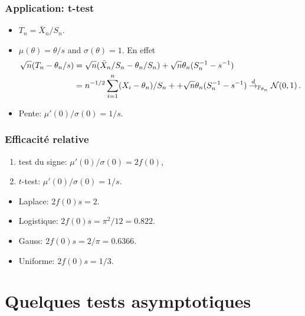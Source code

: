 \begin{frame}
\frametitle{Application: t-test}
\begin{itemize}
\item $T_n = \bar{X}_n/S_n$.
\item $\mu(\theta)= \theta/s$ and $\sigma(\theta)= 1$. En effet
\begin{align*}
\sqrt{n} ( T_n - \theta_n/s) 
&= \sqrt{n} ( \bar{X}_n / S_n - \theta_n / S_n) + \sqrt{n} \theta_n (S_n^{-1} - s^{-1}) \\
&= n^{-1/2} \sum_{i=1}^n (X_i - \theta_n)/S_n + + \sqrt{n} \theta_n (S_n^{-1} - s^{-1}) \stackrel{d}{\rightarrow}_{\operatorname{{\mathbb P}}_{\theta_n}} \mathcal{N}(0,1) \,.
\end{align*}
\item \alert{Pente:} $\mu'(0)/\sigma(0)= 1/s$.
\end{itemize}
\end{frame}

\begin{frame}
\frametitle{Efficacité relative}
\begin{enumerate}
\item test du signe: $\mu'(0)/\sigma(0)=2 f(0)$,
\item $t$-test: $\mu'(0)/\sigma(0)=1/s$.
\end{enumerate}

\begin{itemize}
\item Laplace: $2 f(0) s = 2$.
\item Logistique: $2 f(0) s = \pi^2/12=0.822$.
\item Gauss: $2 f(0) s = 2/\pi=0.6366$.
\item Uniforme: $2 f(0) s = 1/3$.
\end{itemize}
\end{frame}

\section{Quelques tests asymptotiques}

